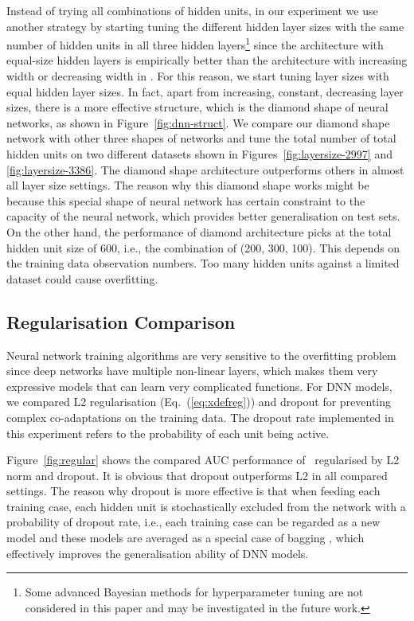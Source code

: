\documentclass{llncs}
\newcommand{\snnrbm}{\text{SNN-RBM}}
\begin{document}
Instead of trying all combinations of hidden units, in our experiment we use another strategy by starting tuning the different hidden layer sizes with the same number of hidden units in all three hidden layers\footnote{Some advanced Bayesian methods for hyperparameter tuning \cite{snoek2012practical} are not considered in this paper and may be investigated in the future work.} since the architecture with equal-size hidden layers is empirically better than the architecture with increasing width or decreasing width in \cite{larochelle2009exploring}. For this reason, we start tuning layer sizes with equal hidden layer sizes. In fact, apart from increasing, constant, decreasing layer sizes, there is a more effective structure, which is the diamond shape of neural networks, as shown in Figure~\ref{fig:dnn-struct}. We compare our diamond shape network with other three shapes of networks and tune the total number of total hidden units on two different datasets shown in Figures~\ref{fig:layersize-2997} and \ref{fig:layersize-3386}. The diamond shape architecture outperforms others in almost all layer size settings. The reason why this diamond shape works might be because this special shape of neural network has certain constraint to the capacity of the neural network, which provides better generalisation on test sets. On the other hand, the performance of diamond architecture picks at the total hidden unit size of 600, i.e., the combination of (200, 300, 100). This depends on the training data observation numbers. Too many hidden units against a limited dataset could cause overfitting.








\vspace{-0pt}
\subsection{Regularisation Comparison}\label{sec:reg}
Neural network training algorithms are very sensitive to the overfitting problem since deep networks have multiple non-linear layers, which makes them very expressive models that can learn very complicated functions. For DNN models, we compared L2 regularisation (Eq.~(\ref{eq:xdefreg})) and dropout \cite{srivastava2014dropout} for preventing complex co-adaptations on the training data. The dropout rate implemented in this experiment refers to the probability of each unit being active.

Figure~\ref{fig:regular} shows the compared AUC performance of \snnrbm~regularised by L2 norm and dropout. It is obvious that dropout outperforms L2 in all compared settings. The reason why dropout is more effective is that when feeding each training case, each hidden unit is stochastically excluded from the network with a probability of dropout rate, i.e., each training case can be regarded as a new model and these models are averaged as a special case of bagging \cite{breiman1996bagging}, which effectively improves the generalisation ability of DNN models.
\end{document}
